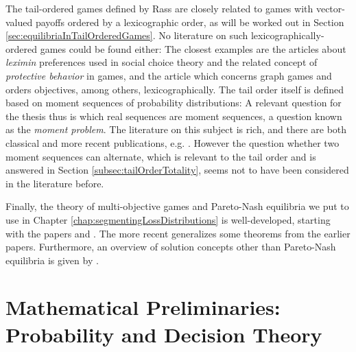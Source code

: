 \documentclass[a4paper,DIV=11,abstracton,twoside=semi]{scrreprt}
\theoremstyle{definition}
\begin{document}
    The tail-ordered games defined by Rass are closely related to games with vector-valued payoffs ordered by a lexicographic order, as will be worked out in Section \ref{sec:equilibriaInTailOrderedGames}. No literature on such lexicographically-ordered games could be found either:
    The closest examples are the articles \cites{bib:salvadorLeximin, bib:quantPropernessProtectiveness} about \emph{leximin} preferences used in social choice theory and the related concept of \emph{protective behavior} in games, and the article \cite{bib:bouyerConcurrentGamesWithOrderedObjectives} which concerns graph games and orders objectives, among others, lexicographically.
    The tail order itself is defined based on moment sequences of probability distributions: A relevant question for the thesis thus is which real sequences are moment sequences, a question known as the \emph{moment problem}. The literature on this subject is rich, and there are both classical and more recent publications, e.g. \cite{bib:hausdorffMomentprobleme,bib:akhiezerClassicalMomentProblem,bib:chiharaIndeterminateHamburgerMomentProblems,bib:schmuedgenTheMomentProblem}. 
    However the question whether two moment sequences can alternate, which is relevant to the tail order and is answered in Section \ref{subsec:tailOrderTotality}, seems not to have been considered in the literature before.
    
    \enlargethispage*{\baselineskip}
    Finally, the theory of multi-objective games and Pareto-Nash equilibria we put to use in {Chapter \ref{chap:segmentingLossDistributions}} is well-developed, starting with the papers \cite{bib:blackwellVectorPayoffs} and \cite{bib:shapleyMultiobjectiveEquilibriumPoints}. The more recent \cite{bib:paretoNashEquilibria} generalizes some theorems from the earlier papers. Furthermore, an overview of solution concepts other than Pareto-Nash equilibria is given by \cite{bib:ghoseSolutionConceptsMultiobjective}.
    
    
    \chapter{Mathematical Preliminaries: Probability and Decision Theory}
    \label{chap:mathematicalPreliminaries}
    
\end{document}
